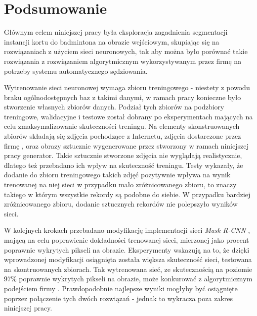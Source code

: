\chapter{Podsumowanie}

Głównym celem niniejszej pracy była eksploracja zagadnienia segmentacji instancji kortu do badmintona na obrazie wejściowym, skupiając się na rozwiązaniach z użyciem sieci neuronowych, tak aby można było porównać takie rozwiązania z rozwiązaniem algorytmicznym wykorzystywanym przez firmę \blue{} na potrzeby systemu automatycznego sędziowania.

Wytrenowanie sieci neuronowej wymaga zbioru treningowego - niestety z powodu braku ogólnodostępnych baz z takimi danymi, w ramach pracy konieczne było stworzenie własnych zbiorów danych. Podział tych zbiorów na podzbiory treningowe, walidacyjne i testowe został dobrany po eksperymentach mających na celu zmaksymalizowanie skuteczności treningu. Na elementy skonstruowanych zbiorów składają się zdjęcia pochodzące z Internetu, zdjęcia dostarczone przez firmę \blue{}, oraz obrazy sztucznie wygenerowane przez stworzony w ramach niniejszej pracy generator. Takie sztucznie stworzone zdjęcia nie wyglądają realistycznie, dlatego też przebadano ich wpływ na skuteczność treningu. Testy wykazały, że dodanie do zbioru treningowego takich zdjęć pozytywnie wpływa na wynik trenowanej na niej sieci w przypadku mało zróżnicowanego zbioru, to znaczy takiego w którym wszystkie rekordy są podobne do siebie. W przypadku bardziej zróżnicowanego zbioru, dodanie sztucznych rekordów nie polepszyło wyników sieci.

W kolejnych krokach przebadano modyfikację implementacji sieci \textit{Mask R-CNN} \cite{matterport-mask-rcnn}, mającą na celu poprawienie dokładności trenowanej sieci, mierzonej jako procent poprawnie wykrytych pikseli na obrazie. Eksperymenty wskazują na to, że dzięki wprowadzonej modyfikacji osiągnięta została większa skuteczność sieci, testowana na skontruowanych zbiorach. Tak wytrenowana sieć, ze skutecznością na poziomie 97\% poprawnie wykrytych pikseli na obrazie, może konkurować z algorytmicznym podejściem firmy \blue{}. Prawdopodobnie najlepsze wyniki mogłyby być osiągnięte poprzez połączenie tych dwóch rozwiązań - jednak to wykracza poza zakres niniejszej pracy.

